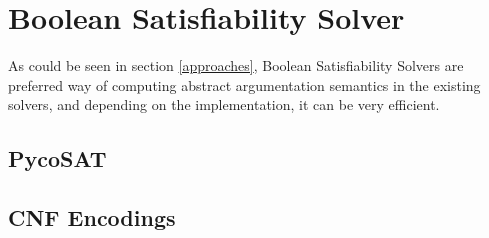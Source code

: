 \section{Boolean Satisfiability Solver}
As could be seen in section \ref{approaches}, Boolean Satisfiability Solvers are preferred way of computing abstract argumentation semantics in the existing solvers, and depending on the implementation, it can be very efficient. 

\subsection{PycoSAT}
\subsection{CNF Encodings}
